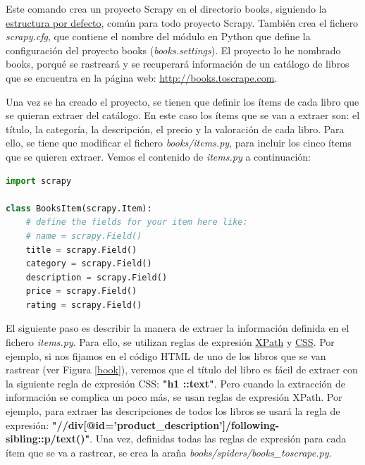 \documentclass{uimppracticas}
\begin{document}
Este comando crea un proyecto Scrapy en el directorio books, siguiendo la \href{https://docs.scrapy.org/en/latest/topics/commands.html#default-structure-of-scrapy-projects}{estructura por defecto}, común para todo proyecto Scrapy. También crea el fichero \textit{scrapy.cfg}, que contiene el nombre del módulo en Python que define la configuración del proyecto books (\textit{books.settings}). El proyecto lo he nombrado books, porqué se rastreará y se recuperará información de un catálogo de libros que se encuentra en la página web: \url{http://books.toscrape.com}.

Una vez se ha creado el proyecto, se tienen que definir los ítems de cada libro que se quieran extraer del catálogo. En este caso los ítems que se van a extraer son: el título, la categoría, la descripción, el precio y la valoración de cada libro. Para ello, se tiene que modificar el fichero \textit{books/items.py}, para incluir los cinco ítems que se quieren extraer. Vemos el contenido de \textit{items.py} a continuación:

\begin{lstlisting}[language=python]
import scrapy

class BooksItem(scrapy.Item):
	# define the fields for your item here like:
	# name = scrapy.Field()
	title = scrapy.Field()
	category = scrapy.Field()
	description = scrapy.Field()
	price = scrapy.Field()
	rating = scrapy.Field()
\end{lstlisting}

El siguiente paso es describir la manera de extraer la información definida en el fichero \textit{items.py}. Para ello, se utilizan reglas de expresión \href{https://www.w3.org/TR/xpath/all/}{XPath} y \href{https://www.w3.org/TR/selectors/}{CSS}. Por ejemplo, si nos fijamos en el código HTML de uno de los libros que se van rastrear (ver Figura \ref{book}), veremos que el título del libro es fácil de extraer con la siguiente regla de expresión CSS: \textbf{"h1 ::text"}. Pero cuando la extracción de información se complica un poco más, se usan reglas de expresión XPath. Por ejemplo, para extraer las descripciones de todos los libros se usará la regla de expresión: \textbf{"//div[@id='product\_description']/following-sibling::p/text()"}. Una vez, definidas todas las reglas de expresión para cada ítem que se va a rastrear, se crea la araña \textit{books/spiders/books\_toscrape.py}.
\end{document}
